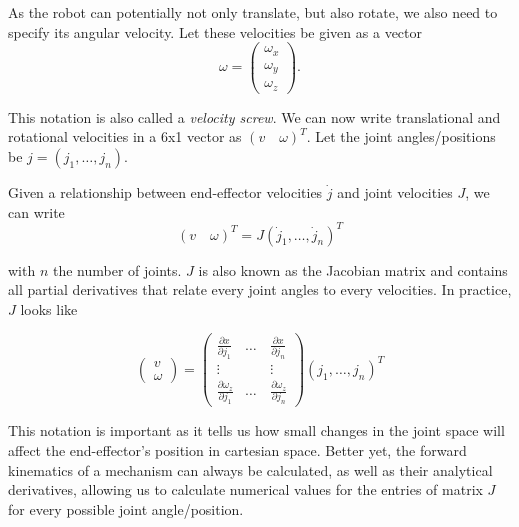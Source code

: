  As the robot can potentially not only translate, but also rotate, we also need to specify its angular velocity. Let these velocities be given as a vector 
\begin{equation}
\omega=\left(\begin{array}{c}
\omega_x\\
\omega_y\\
\omega_z
\end{array}
\right).
\end{equation}

This notation is also called a \emph{velocity screw}. %
We can now write translational and rotational velocities in a 6x1 vector as $ (v \quad \omega)^T$. Let the joint angles/positions be $j=(j_1, \ldots, j_n)$.

Given a relationship between end-effector velocities $\dot{j}$ and joint velocities $J$, we can write
\begin{equation}
 (v \quad \omega)^T=J(\dot{j}_1,\ldots,\dot{j}_n)^T
\end{equation}

with $ n$ the number of joints. $J$ is also known as the Jacobian matrix  and contains all partial derivatives that relate every joint angles to every velocities. In practice, $J$ looks like

\begin{equation}
\left(\begin{array}{c}v\\\omega\end{array}\right)=\left(\begin{array}{ccc}\frac{\partial{x}}{\partial{j_1}} & \ldots & \frac{\partial{x}}{\partial{j_n}}\\\vdots & \quad & \vdots\\\frac{\partial{\omega_z}}{\partial{j_1}} & \ldots & \frac{\partial{\omega_z}}{\partial{j_n}}\end{array}\right)(j_1,\ldots,j_n)^T
\end{equation}

This notation is important as it tells us how small changes in the joint space will affect the end-effector's position in cartesian space. Better yet, the forward kinematics of a mechanism can always be calculated, as well as their analytical derivatives, allowing us to calculate numerical values for the entries of matrix $J$ for every possible joint angle/position.

